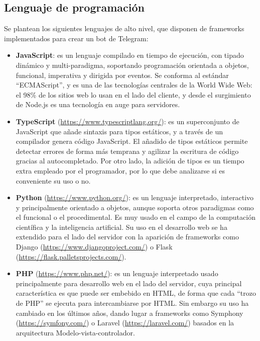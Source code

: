 \subsection{Lenguaje de programación}
Se plantean los siguientes lenguajes de alto nivel, que disponen de frameworks implementados para crear un bot de Telegram:

\begin{itemize}
    \item \textbf{JavaScript}: es un lenguaje compilado en tiempo de ejecución, con tipado dinámico y multi-paradigma, soportando programación orientada a objetos, funcional, imperativa y dirigida por eventos\cite{wiki:JavaScript}. Se conforma al estándar ``ECMAScript'', y es una de las tecnologías centrales de la World Wide Web: el 98\% de los sitios web lo usan en el lado del cliente\cite{javascriptUsage}, y desde el surgimiento de Node.js es una tecnología en auge para servidores.
    \item \textbf{TypeScript} (\url{https://www.typescriptlang.org/}): es un superconjunto de JavaScript que añade sintaxis para tipos estáticos, y a través de un compilador genera código JavaScript\cite{typescriptWeb}. El añadido de tipos estáticos permite detectar errores de forma más temprana y agilizar la escritura de código gracias al autocompletado. Por otro lado, la adición de tipos es un tiempo extra empleado por el programador, por lo que debe analizarse si es conveniente su uso o no.
    \item \textbf{Python} (\url{https://www.python.org/}): es un lenguaje interpretado, interactivo y principalmente orientado a objetos, aunque soporta otros paradigmas como el funcional o el procedimental\cite{pythonFAQGeneral}. Es muy usado en el campo de la computación científica y la inteligencia artificial. Su uso en el desarrollo web se ha extendido para el lado del servidor con la aparición de frameworks como Django (\url{https://www.djangoproject.com/}) o Flask (\url{https://flask.palletsprojects.com/}).
    \item \textbf{PHP} (\url{https://www.php.net/}): es un lenguaje interpretado usado principalmente para desarrollo web en el lado del servidor, cuya principal característica es que puede ser embebido en HTML, de forma que cada ``trozo de PHP'' se ejecuta para intercambiarse por HTML. Sin embargo su uso ha cambiado en los últimos años, dando lugar a frameworks como Symphony (\url{https://symfony.com/}) o Laravel (\url{https://laravel.com/}) basados en la arquitectura Modelo-vista-controlador.
\end{itemize}

